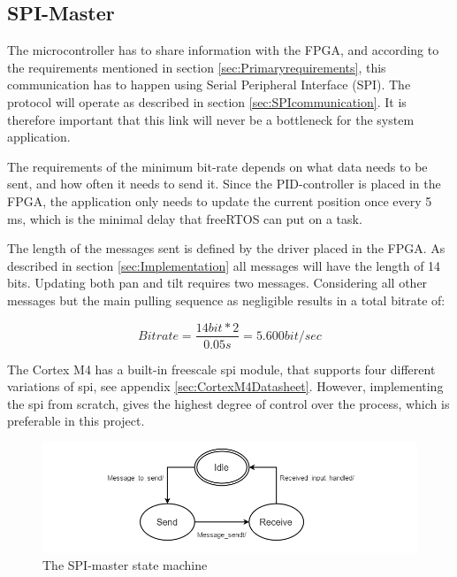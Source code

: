 \subsection{SPI-Master}
\label{sec:SPIMaster}

The microcontroller has to share information with the FPGA, and according to the requirements mentioned in section \ref{sec:Primaryrequirements}, this communication has to happen using Serial Peripheral Interface (SPI). The protocol will operate as described in section \ref{sec:SPIcommunication}. It is therefore important that this link will never be a bottleneck for the system application. 

The requirements of the minimum bit-rate depends on what data needs to be sent, and how often it needs to send it. Since the PID-controller is placed in the FPGA, the application only needs to update the current position once every 5 ms, which is the minimal delay that freeRTOS can put on a task. 

The length of the messages sent is defined by the driver placed in the FPGA. As described in section \ref{sec:Implementation} all messages will have the length of 14 bits. Updating both pan and tilt requires two messages. Considering all other messages but the main pulling sequence as negligible results in a total bitrate of:

\begin{equation}
Bitrate = \frac{
14 bit * 2	
}{
0.05s
} = 5.600 bit/sec 
\end{equation}

The Cortex M4 has a built-in freescale spi module, that supports four different variations of spi, see appendix \ref{sec:CortexM4Datasheet}. However, implementing the spi from scratch, gives the highest degree of control over the process, which is preferable in this project. 

\begin{figure}
	\centering
	\includegraphics[scale = 0.7] {Billeder/SPI-master}
	\caption{The SPI-master state machine}
	\label{fig:SPI-master}
\end{figure}

